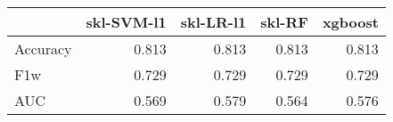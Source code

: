 \begin{tabular}{lrrrr}
\toprule
{} &  skl-SVM-l1 &  skl-LR-l1 &  skl-RF &  xgboost \\
\midrule
Accuracy &       0.813 &      0.813 &   0.813 &    0.813 \\
F1w      &       0.729 &      0.729 &   0.729 &    0.729 \\
AUC      &       0.569 &      0.579 &   0.564 &    0.576 \\
\bottomrule
\end{tabular}

